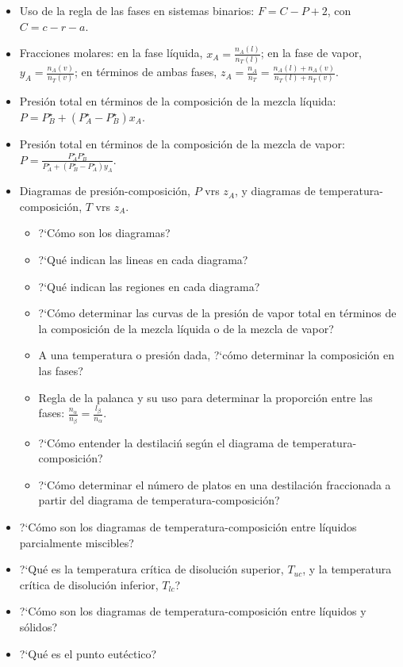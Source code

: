 \documentclass[a4paper,12pt]{article}
\begin{document}
\begin{itemize} 
 \item Uso de la regla de las fases en sistemas binarios: $F=C-P+2$, con $C=c-r-a$.
 \item Fracciones molares: en la fase l\'iquida, $x_A=\frac{n_A(l)}{n_T(l)}$; en la fase de vapor, $y_A=\frac{n_A(v)}{n_T(v)}$; en t\'erminos de ambas fases, $z_A=\frac{n_A}{n_T}=\frac{n_A(l)+n_A(v)}{n_T(l)+n_T(v)}$.
 \item Presi\'on total en t\'erminos de la composici\'on de la mezcla l\'iquida: $P=P_B^\star+(P_A^\star-P_B^\star)x_A$.
 \item Presi\'on total en t\'erminos de la composici\'on de la mezcla de vapor: $P=\frac{P_A^\star P_B^\star}{P_A^\star+(P_B^\star-P_A^\star)y_A}$.
 \item Diagramas de presión-composici\'on, $P$ vrs $z_A$, y diagramas de temperatura-composici\'on, $T$ vrs $z_A$. 
 \begin{itemize}
  \item ?`C\'omo son los diagramas?
  \item ?`Qu\'e indican las lineas en cada diagrama?
  \item ?`Qu\'e indican las regiones en cada diagrama?
  \item ?`C\'omo determinar las curvas de la presi\'on de vapor total en t\'erminos de la composici\'on de la mezcla l\'iquida o de la mezcla de vapor?
  \item A una temperatura o presi\'on dada, ?`c\'omo determinar la composici\'on en las fases?
  \item Regla de la palanca y su uso para determinar la proporci\'on entre las fases: $\frac{n_\alpha}{n_\beta}=\frac{l_\beta}{n_\alpha}$.
  \item ?`C\'omo entender la destilaci\'n seg\'un el diagrama de temperatura-composici\'on?
  \item ?`C\'omo determinar el n\'umero de platos en una destilaci\'on fraccionada a partir del diagrama de temperatura-composici\'on?
 \end{itemize}

 \item ?`C\'omo son los diagramas de temperatura-composici\'on entre l\'iquidos parcialmente miscibles?
 \item ?`Qu\'e es la temperatura cr\'itica de disoluci\'on superior, $T_{uc}$, y la temperatura cr\'itica de disoluci\'on inferior, $T_{lc}$?
 \item ?`C\'omo son los diagramas de temperatura-composici\'on entre  l\'iquidos y s\'olidos?
 \item ?`Qu\'e es el punto eut\'ectico?
\end{itemize}
\end{document}
